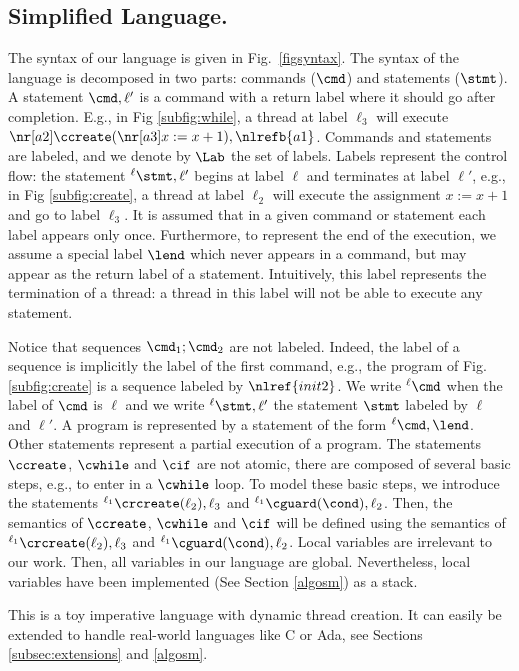 \documentclass[12pt]{article}
\newcommand{\lab}{  {}^{\ell}}
\newcommand{\li}[1]{ {}^{\ell_{#1}}  }
\newcounter{labels}[figure]
\begin{document}
\subsection{Simplified Language.} The syntax of our language is given in Fig.~\ref{figsyntax}. The syntax of the language is decomposed in two parts: commands (\(\cmd\)) and statements (\(\stmt\)). A statement \(\cmd,\ell'\) is a command with a return label where it should go after completion. E.g., in Fig \ref{subfig:while}, a thread at label \(\ell_3\) will execute \(\nr[a2]\ccreate(\nr[a3] x:=x+1),\nlrefb{a1}\).
Commands and statements are labeled, and we denote by \(\Lab\) the set of labels. Labels represent the control flow: the statement \(\lab \stmt,\ell'\) begins at label \(\ell\) and terminates at label \(\ell'\), e.g., in Fig \ref{subfig:create}, a thread at label \(\ell_2\) will execute the assignment \(x:=x+1\) and go to label \(\ell_3\). It is assumed that in a given command or statement each label appears only once. Furthermore, to represent the end of the execution, we assume a special label \(\lend\) which never appears in a command, but may appear as the return label of a statement. Intuitively, this label represents the termination of a thread: a thread in this label will not be able to execute any statement.

Notice that sequences \(\cmd_1;\cmd_2\) are not labeled. Indeed, the label of a sequence is implicitly the label of the first command, e.g., the program of Fig. \ref{subfig:create} is a sequence labeled by \(\nlref{init2}\). We write \(\lab \cmd\) when the label of \(\cmd\) is \(\ell\) and we write \(\lab \stmt,\ell'\) the statement \(\stmt\) labeled by \(\ell\) and \(\ell'\).
 A program is represented by a statement of the form \(\lab \cmd,\lend\). Other statements represent a partial execution of a program.
  The statements \(\ccreate\), \(\cwhile\) and \(\cif\) are not atomic, there are composed of several basic steps, e.g., to enter in a \(\cwhile\) loop. To model these basic steps, we introduce the statements \(\li1\crcreate(\ell_2),\ell_3\) and \(\li1\cguard(\cond),\ell_2\). Then, the semantics of  \(\ccreate\), \(\cwhile\) and \(\cif\) will be defined using the semantics of \(\li1\crcreate(\ell_2),\ell_3\) and \(\li1\cguard(\cond),\ell_2\).
 Local variables are irrelevant to our work. Then, all variables in our language are global. 
 Nevertheless, local variables have been implemented (See Section \ref{algosm}) as a stack.
 
This is a toy imperative language with dynamic thread creation. It can easily be extended to handle real-world languages like C or Ada, see Sections \ref{subsec:extensions} and \ref{algosm}.
\end{document}
